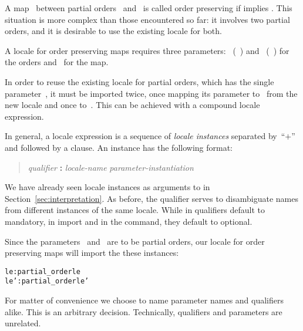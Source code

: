 \begin{isabellebody}
\isamarkuptrue%
%
\isamarkuptrue%
%
\begin{isamarkuptext}%
A map~ between partial orders~ and~
  is called order preserving if  implies .  This situation is more complex than those encountered so
  far: it involves two partial orders, and it is desirable to use the
  existing locale for both.

  A locale for order preserving maps requires three parameters: ~(~) and ~(~) for the orders and~
  for the map.

  In order to reuse the existing locale for partial orders, which has
  the single parameter~, it must be imported twice, once
  mapping its parameter to~ from the new locale and once
  to~.  This can be achieved with a compound locale
  expression.

  In general, a locale expression is a sequence of \emph{locale instances}
  separated by~``$\textbf{+}$'' and followed by a 
  clause.
  An instance has the following format:
\begin{quote}
  \textit{qualifier} \textbf{:} \textit{locale-name}
  \textit{parameter-instantiation}
\end{quote}
  We have already seen locale instances as arguments to
   in Section~\ref{sec:interpretation}.
  As before, the qualifier serves to disambiguate names from
  different instances of the same locale.  While in
   qualifiers default to mandatory, in
  import and in the  command, they default to
  optional.

  Since the parameters~ and~ are to be partial
  orders, our locale for order preserving maps will import the these
  instances:
\begin{small}
\begin{alltt}
  le: partial_order le
  le': partial_order le'
\end{alltt}
\end{small}
  For matter of convenience we choose to name parameter names and
  qualifiers alike.  This is an arbitrary decision.  Technically, qualifiers
  and parameters are unrelated.


\end{isamarkuptext}
\end{isabellebody}
